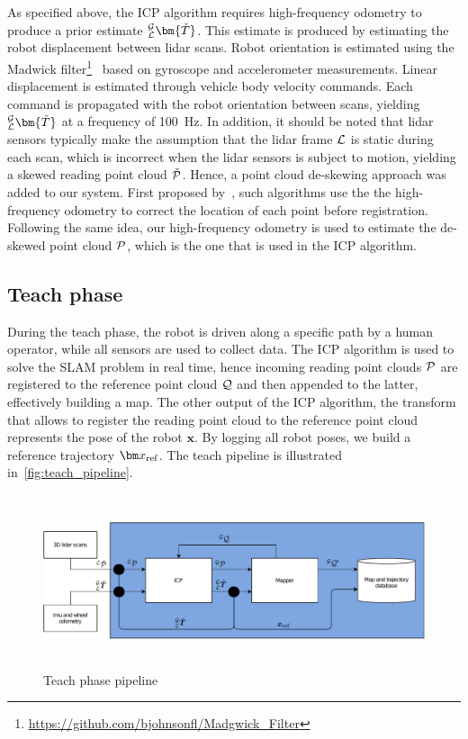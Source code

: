 As specified above, the \ac{ICP} algorithm requires high-frequency odometry to produce a prior estimate $_{\lidarf}^{\mapf}\bm{\check{T}}$.
This estimate is produced by estimating the robot displacement between lidar scans. 
Robot orientation is estimated using the Madwick filter\footnote{\url{https://github.com/bjohnsonfl/Madgwick_Filter}}~\citep{Madgwick2011} based on gyroscope and accelerometer measurements.
Linear displacement is estimated through vehicle body velocity commands.
Each command is propagated with the robot orientation between scans, yielding $_{\lidarf}^{\mapf}\bm{\check{T}}$ at a frequency of \SI{100}{Hz}.
In addition, it should be noted that lidar sensors typically make the assumption that the lidar frame $\mathcal{L}$ is static during each scan, which is incorrect when the lidar sensors is subject to motion, yielding a skewed reading point cloud $\check{\mathcal{P}}$.
Hence, a point cloud de-skewing approach was added to our system.
First proposed by~\citet{Bosse2009}, such algorithms use the the high-frequency odometry to correct the location of each point before registration.
Following the same idea, our high-frequency odometry is used to estimate the de-skewed point cloud $\mathcal{P}$, which is the one that is used in the \ac{ICP} algorithm.


\subsection{Teach phase}
\label{sec:teach_phase}

During the teach phase, the robot is driven along a specific path by a human operator, while all sensors are used to collect data.
The \ac{ICP} algorithm is used to solve the \ac{SLAM} problem in real time, hence incoming reading point clouds $\mathcal{P}$ are registered to the reference point cloud $\mathcal{Q}$ and then appended to the latter, effectively building a map.
The other output of the \ac{ICP} algorithm, the transform that allows to register the reading point cloud to the reference point cloud \transform{\lidarf}{\mapf} represents the pose of the robot $\bm x$.
By logging all robot poses, we build a reference trajectory $\reftraj$.
The teach pipeline is illustrated in~\autoref{fig:teach_pipeline}.


\begin{figure} [htpb]
	\centering
	\includegraphics[height=2.0in]{figs/teach_pipeline/teach_pipeline.pdf}
	\caption{Teach phase pipeline}
	\label{fig:teach_pipeline}
\end{figure}

